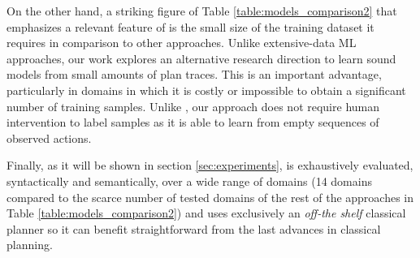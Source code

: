 On the other hand, a striking figure of Table \ref{table:models_comparison2} that emphasizes a relevant feature of \FAMA is the small size of the training dataset it requires in comparison to other approaches. Unlike extensive-data ML approaches, our work explores an alternative research direction to learn sound models from small amounts of plan traces. This is an important advantage, particularly in domains in which it is costly or impossible to obtain a significant number of training samples. Unlike \CAMA, our approach does not require human intervention to label samples as it is able to learn from empty sequences of observed actions.


Finally, as it will be shown in section \ref{sec:experiments}, \FAMA is exhaustively evaluated, syntactically and semantically, over a wide range of domains (14 domains compared to the scarce number of tested domains of the rest of the approaches in Table \ref{table:models_comparison2}) and uses exclusively an \emph{off-the shelf} classical planner so it can benefit straightforward from the last advances in classical planning.


























